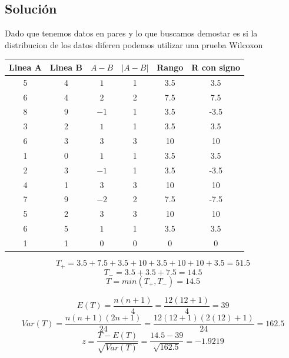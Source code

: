 \documentclass{article}
\begin{document}
\subsection*{Solución}
Dado que tenemos datos en pares y lo que buscamos demostar es si la distribucion de los datos diferen podemos utilizar una prueba Wilcoxon

\begin{center}
    \begin{tabular}{c c c c c c}
        Linea A & Linea B & $ A - B $ & $| A - B |$ & Rango & R con signo \\
        \hline
        5       & 4       & $1$       & 1           & 3.5   & 3.5         \\
        6       & 4       & $2$       & 2           & 7.5   & 7.5         \\
        8       & 9       & $-1$      & 1           & 3.5   & -3.5        \\
        3       & 2       & $1$       & 1           & 3.5   & 3.5         \\
        6       & 3       & $3$       & 3           & 10    & 10          \\
        1       & 0       & $1$       & 1           & 3.5   & 3.5         \\
        2       & 3       & $-1$      & 1           & 3.5   & -3.5        \\
        4       & 1       & $3$       & 3           & 10    & 10          \\
        7       & 9       & $-2$      & 2           & 7.5   & -7.5        \\
        5       & 2       & $3$       & 3           & 10    & 10          \\
        6       & 5       & $1$       & 1           & 3.5   & 3.5         \\
        1       & 1       & $0$       & 0           & 0     & 0           \\
    \end{tabular}
\end{center}

\[T_{+} = 3.5 + 7.5 + 3.5 + 10 + 3.5 + 10 + 10 + 3.5 = 51.5\]
\[T_{-} = 3.5 + 3.5 + 7.5 = 14.5\]
\[T = min(T_{+}, T_{-}) = 14.5\]

\[
    E(T) = \frac{n(n + 1)}{4} = \frac{12(12 + 1)}{4} = 39
\]
\[
    Var(T) = \frac{n(n + 1)(2n + 1)}{24} = \frac{12(12 + 1)(2(12) + 1)}{24} = 162.5
\]
\[
    z = \frac{T - E(T)}{\sqrt{Var(T)}} = \frac{14.5 - 39}{\sqrt{162.5}} = -1.9219
\]
\end{document}

